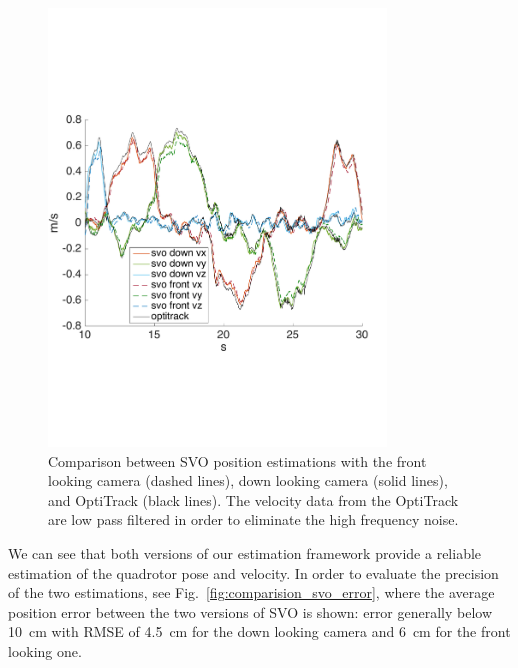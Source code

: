 \begin{figure}[!ht]
    \centering
    \includegraphics[width=0.8\textwidth]{img/comparision_between_two_svo_and_opti_velocities.pdf}
    \caption{Comparison between SVO position estimations with the front looking camera (dashed lines), down looking camera (solid lines), and OptiTrack (black lines). The velocity data from the OptiTrack are low pass filtered in order to eliminate the high frequency noise. }
    \label{fig:comparision_svo_velocities}
\end{figure}

We can see that both versions of our estimation framework provide a reliable estimation of the quadrotor pose and velocity. In order to evaluate the precision of the two estimations, see Fig.~\ref{fig:comparision_svo_error}, where the average position error between the two versions of SVO is shown: error generally below \SI{10}{\centi \meter} with RMSE of \SI{4.5}{\centi \meter} for the down looking camera and \SI{6}{\centi \meter} for the front looking one.\\

